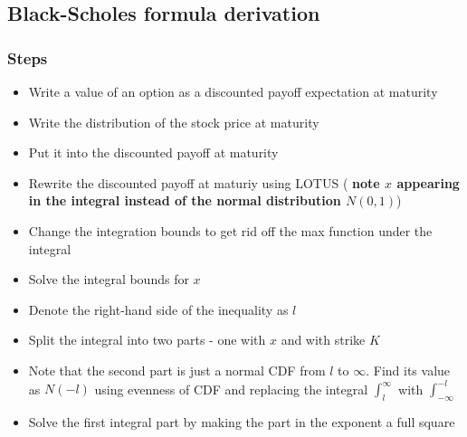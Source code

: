 \subsection{Black-Scholes formula derivation}

\subsubsection{Steps}
\begin{itemize}
	\item Write a value of an option as a discounted payoff expectation at maturity
	\item Write the distribution of the stock price at maturity
	\item Put it into the discounted payoff at maturity
	\item Rewrite the discounted payoff at maturiy using LOTUS (\textbf{\color{red} note $x$ appearing in the integral instead of the normal distribution $N(0, 1)$})
	\item Change the integration bounds to get rid off the max function under the integral
	\item Solve the integral bounds for $x$
	\item Denote the right-hand side of the inequality as $l$
	\item Split the integral into two parts - one with $x$ and with strike $K$
	\item Note that the second part is just a normal CDF from $l$ to $\infty$. Find its value as $N(-l)$ using evenness of CDF and replacing the integral $\int_{l}^{\infty}$ with $\int_{-\infty}^{-l}$
	\item Solve the first integral part by making the part in the exponent a full square
\end{itemize}


